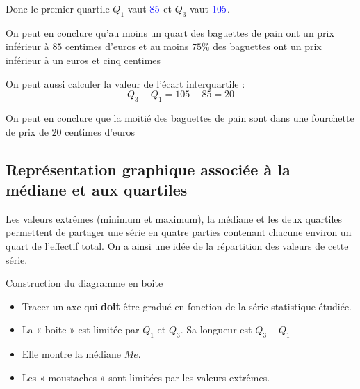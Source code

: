 \documentclass[10pt,a4paper,openany,twoside, eleve]{book}
\begin{document}
\begin{ex}{}{}
\noindent Donc le premier quartile $Q_{1}$ vaut $\textcolor{blue}{85}$ et $Q_{3}$ vaut $\textcolor{blue}{105}$.

\noindent On peut en conclure qu'au moins un quart des baguettes de pain ont un prix inférieur à $85$ centimes d'euros et au moins $75\%$ des baguettes ont un prix inférieur à un euros et cinq centimes
\medskip

\noindent On peut aussi calculer la valeur de l'écart interquartile :
\[Q_{3} - Q_{1} = 105 - 85 = 20\]

\noindent On peut en conclure que la moitié des baguettes de pain sont dans une fourchette de prix de $20$ centimes d'euros

\end{ex}

\subsection{Représentation graphique associée à la médiane et aux quartiles}

Les valeurs extrêmes (minimum et maximum), la médiane et les deux quartiles permettent de partager une série en quatre parties contenant chacune environ un quart de l'effectif total. On a ainsi une idée de la répartition des valeurs de cette série.

\begin{methode}{Construction du diagramme en boite}{}
\begin{itemize}
\item  Tracer un axe qui \textbf{doit} être gradué en fonction de la série statistique étudiée.
\item  La « boite » est limitée par $Q_{1}$ et $Q_{3}$. Sa longueur est $Q_{3} - Q_{1}$
\item  Elle montre la médiane $Me$.
\item  Les « moustaches » sont limitées par les valeurs extrêmes.
\end{itemize}
\bigbreak

\end{methode}
\end{document}
